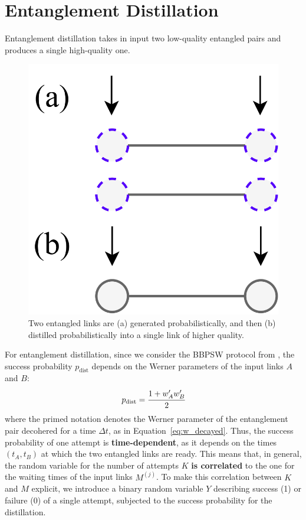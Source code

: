 \documentclass{masterthesis}
\begin{document}

\section{Entanglement Distillation}

Entanglement distillation takes in input two low-quality entangled pairs and produces a single high-quality one.

\begin{figure}[ht]
    \centering
    \includegraphics[width=0.33\linewidth]{images/dist.png}
    \caption{Two entangled links are (a) generated probabilistically, and then (b) distilled probabilistically into a single link of higher quality.}\label{fig:entanglement_distillation}
\end{figure}

For entanglement distillation, since we consider the BBPSW protocol from \textcite{bennett1996purification}, the success probability $p_\text{dist}$ depends on the Werner parameters of the input links $A$ and $B$:
\begin{equation}\label{eq:distillation_success_probability}
    p_\text{dist} = \cfrac{1+w_A'w_B'}{2}
\end{equation}
where the primed notation denotes the Werner parameter of the entanglement pair decohered for a time $\Delta t$, as in Equation~\ref{eq:w_decayed}.
Thus, the success probability of one attempt is \textbf{time-dependent}, as it depends on the times $(t_A, t_B)$ at which the two entangled links are ready.
This means that, in general, the random variable for the number of attempts $K$ \textbf{is correlated} to the one for the waiting times of the input links $M^{(j)}$.
To make this correlation between $K$ and $M$ explicit, we introduce a binary random variable $Y$ describing success (1) or failure (0) of a single attempt, subjected to the success probability for the distillation.
\end{document}
